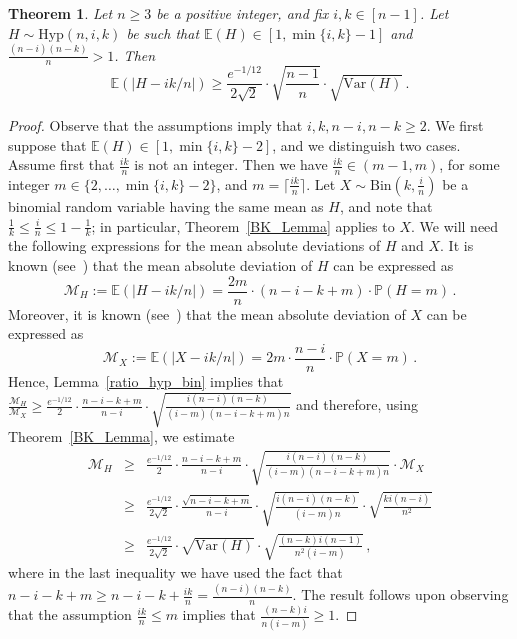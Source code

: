 \documentclass[10pt]{article}
\theoremstyle{plain}
\newtheorem{theorem}{Theorem}[section]
\theoremstyle{definition}
\theoremstyle{remark}
\newcommand{\Prb}{\mathbb{P}}
\newcommand{\Exp}{\mathbb{E}}
\begin{document}
\begin{theorem}\label{ratio_hyp_bin_exp}
Let $n\ge 3$ be a positive integer, and fix $i,k\in [n-1]$.
Let $H\sim\text{Hyp}(n,i,k)$ be such that 
$\Exp(H) \in [1, \min\{i,k\} -1]$ and $\frac{(n-i)(n-k)}{n}> 1$. 
Then \, 
\[
\Exp(|H-ik/n|) \ge \frac{e^{-1/12}}{2\sqrt{2}}  \cdot \sqrt{\frac{n-1 }{n}} \cdot \sqrt{\text{Var}(H)} \, .
\]
\end{theorem}
\begin{proof}
Observe that the assumptions imply that $i,k,n-i,n-k\ge 2$. 
We first suppose that $\Exp(H) \in [1, \min\{i,k\} -2]$, and we  distinguish two cases. 
Assume first that $\frac{ik}{n}$ is not an integer. 
Then we have    
$\frac{ik}{n}\in (m-1, m)$, for some  integer 
$m\in \{2,\ldots, \min\{i,k\}-2\}$, and $m=\lceil \frac{ik}{n}\rceil$. 
Let $X\sim\text{Bin}(k,\frac{i}{n})$ be a binomial random variable having the same mean as $H$, and note that $\frac{1}{k}\le \frac{i}{n}\le 1 - \frac{1}{k}$; in particular,  Theorem~\ref{BK_Lemma} applies to $X$.   
We will need the following expressions for the mean absolute deviations of $H$ and $X$. 
It is known (see~\cite[Formula~(3.3), p.554]{Ramasubban}) that the mean absolute deviation of $H$ can be expressed as 
\begin{equation}\label{ramasuban_formula}
\mathcal{M}_H :=\Exp(|H-ik/n|) = \frac{2m}{n}\cdot (n-i-k+m)\cdot\Prb(H=m) \, .
\end{equation}
Moreover, it is known (see~\cite[Formula~(1.1)]{Diaconis_Zabell}) that the mean absolute deviation of $X$ can be expressed as  
\[
\mathcal{M}_X :=\Exp(|X-ik/n|) = 2m\cdot\frac{n-i}{n}\cdot \Prb(X=m) \, .
\]
Hence, Lemma~\ref{ratio_hyp_bin} implies that  
$\frac{\mathcal{M}_H}{\mathcal{M}_X} \ge  \frac{e^{-1/12}}{2} \cdot \frac{n-i-k+m}{n-i} \cdot \sqrt{\frac{i(n-i)(n-k)}{(i-m)(n-i-k+m)n}}$ 
and therefore, using Theorem~\ref{BK_Lemma}, we estimate  
\begin{eqnarray*}
\mathcal{M}_H &\ge&  \frac{e^{-1/12}}{2} \cdot \frac{n-i-k+m}{n-i} \cdot \sqrt{\frac{i(n-i)(n-k)}{(i-m)(n-i-k+m)n}}\cdot \mathcal{M}_X \\
&\ge&  \frac{e^{-1/12}}{2\sqrt{2}} \cdot \frac{\sqrt{n-i-k+m}}{n-i} \cdot \sqrt{\frac{i(n-i)(n-k)}{(i-m)n}}\cdot \sqrt{\frac{ki(n-i)}{n^2}} \\
&\ge&  \frac{e^{-1/12}}{2\sqrt{2}} \cdot \sqrt{\text{Var}(H)} \cdot \sqrt{\frac{(n-k) i (n-1)}{n^2(i-m)}} \, ,
\end{eqnarray*}
where in the last inequality we have used the fact that $n-i-k+m \ge n-i-k+\frac{ik}{n} = \frac{(n-i)(n-k)}{n}$. 
The result follows upon observing that the assumption $\frac{ik}{n}\le m$ implies that $\frac{(n-k)i}{n(i-m)}\ge 1$. 


\end{proof}
\end{document}
